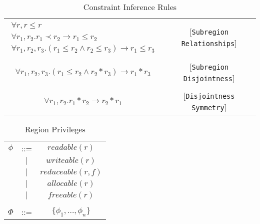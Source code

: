 \documentclass{article}
\begin{document}
\begin{table*}
\centering
{\small
\begin{tabular}{cc}
%
%
\begin{math}
\begin{array}{c}
\forall r, r \le r \\
\forall r_1, r_2. r_1 \prec r_2 \rightarrow r_1 \le r_2 \\
\forall r_1, r_2, r_3. (r_1 \le r_2 \wedge r_2 \le r_3) \rightarrow r_1 \le r_3
\end{array}
\end{math} & [{\tt Subregion Relationships}] \\
\\
\begin{math}
\forall r_1, r_2, r_3. (r_1 \le r_2 \wedge r_2 * r_3) \rightarrow r_1 * r_3
\end{math} & [{\tt Subregion Disjointness}] \\
\\
\begin{math}
\forall r_1, r_2. r_1 * r_2 \rightarrow r_2 * r_1
\end{math} & [{\tt Disjointness Symmetry}]
\end{tabular}
}
\caption{Constraint Inference Rules}
\end{table*}


\begin{table*}
\centering
{\small
\begin{tabular}{ccc}

$\phi$ & ::= & $readable(r)$ \\
  &$\mid$&$writeable(r)$ \\
  &$\mid$&$reduceable(r,f)$ \\
  &$\mid$&$allocable(r)$ \\
  &$\mid$&$freeable(r)$ \\
\\
$\Phi$ & ::= & $\{ \phi_1, \ldots, \phi_n \}$
\end{tabular}
}
\caption{Region Privileges}
\end{table*}
\end{document}
